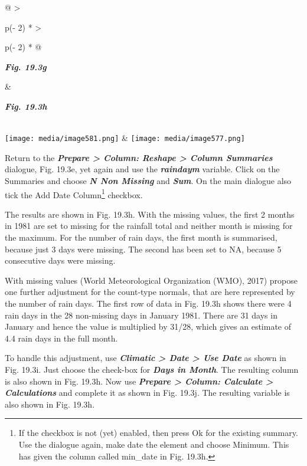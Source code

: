 \documentclass[
  letterpaper,
  DIV=11,
  numbers=noendperiod]{scrreprt}
\begin{document}
\begin{longtable}[]{@{}
  >{\raggedright\arraybackslash}p{(\columnwidth - 2\tabcolsep) * }
  >{\raggedright\arraybackslash}p{(\columnwidth - 2\tabcolsep) * }@{}}
\toprule\noalign{}
\begin{minipage}[b]{\linewidth}\raggedright
\textbf{\emph{Fig. 19.3g}}
\end{minipage} & \begin{minipage}[b]{\linewidth}\raggedright
\textbf{\emph{Fig. 19.3h}}
\end{minipage} \\
\midrule\noalign{}
\endhead
\bottomrule\noalign{}
\endlastfoot
\texttt{[image: media/image581.png]} &
\texttt{[image: media/image577.png]} \\
\end{longtable}

Return to the \textbf{\emph{Prepare \textgreater{} Column: Reshape
\textgreater{} Column Summaries}} dialogue, Fig. 19.3e, yet again and
use the \textbf{\emph{raindaym}} variable. Click on the Summaries and
choose \textbf{\emph{N Non Missing}} and \textbf{\emph{Sum}}. On the
main dialogue also tick the Add Date Column\footnote{If the checkbox is
  not (yet) enabled, then press Ok for the existing summary. Use the
  dialogue again, make date the element and choose Minimum. This has
  given the column called min\_date in Fig. 19.3h.} checkbox.

The results are shown in Fig. 19.3h. With the missing values, the first
2 months in 1981 are set to missing for the rainfall total and neither
month is missing for the maximum. For the number of rain days, the first
month is summarised, because just 3 days were missing. The second has
been set to NA, because 5 consecutive days were missing.

With missing values (World Meteorological Organization (WMO), 2017)
propose one further adjustment for the count-type normals, that are here
represented by the number of rain days. The first row of data in Fig.
19.3h shows there were 4 rain days in the 28 non-missing days in January
1981. There are 31 days in January and hence the value is multiplied by
31/28, which gives an estimate of 4.4 rain days in the full month.

To handle this adjustment, use \textbf{\emph{Climatic \textgreater{}
Date \textgreater{} Use Date}} as shown in Fig. 19.3i. Just choose the
check-box for \textbf{\emph{Days in Month}}. The resulting column is
also shown in Fig. 19.3h. Now use \textbf{\emph{Prepare \textgreater{}
Column: Calculate \textgreater{} Calculations}} and complete it as shown
in Fig. 19.3j. The resulting variable is also shown in Fig. 19.3h.
\end{document}
